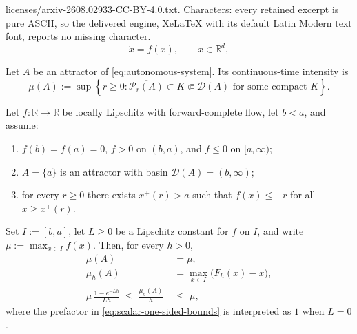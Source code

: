 \documentclass[10pt,a4paper]{amsart}
\begin{document}
licenses/arxiv-2608.02933-CC-BY-4.0.txt. Characters: every retained excerpt is pure ASCII, so the delivered engine, XeLaTeX with its default Latin Modern text font, reports no missing character.
\begin{equation}
\label{eq:autonomous-system}
    \dot x=f(x),\qquad x\in\mathbb R^d,
\end{equation}

\begin{definition}
\label{def:continuous-intensity}
Let $A$ be an attractor of \eqref{eq:autonomous-system}. Its continuous-time intensity is
\begin{equation}
\label{eq:continuous-intensity}
    \mu(A)
    :=
    \sup\left\{
    r\geq0:
    \overline{\mathcal P_r(A)}
    \subset K\Subset\mathcal D(A)
    \text{ for some compact }K
    \right\}.
\end{equation}
\end{definition}

\begin{proposition}
\label{prop:scalar-one-sided}
Let $f:\mathbb R\to\mathbb R$ be locally Lipschitz with forward-complete
flow, let $b<a$, and assume:
\begin{enumerate}
\item $f(b)=f(a)=0$, $f>0$ on $(b,a)$, and $f\leq0$ on $[a,\infty)$;
\item $A=\{a\}$ is an attractor with basin
$\mathcal D(A)=(b,\infty)$;
\item for every $r\geq0$ there exists $x^+(r)>a$ such that
$f(x)\leq-r$ for all $x\geq x^+(r)$.
\end{enumerate}
Set $I:=[b,a]$, let $L\geq0$ be a Lipschitz constant for $f$ on $I$,
and write
    $\mu:=\max_{x\in I}f(x)$.
Then, for every $h>0$,
\begin{align}
\label{eq:scalar-one-sided-continuous}
    \mu(A)&=\mu,\\
\label{eq:scalar-one-sided-discrete}
    \mu_h(A)&=\max_{x\in I}\bigl(F_h(x)-x\bigr),\\
\label{eq:scalar-one-sided-bounds}
    \mu\,\frac{1-e^{-Lh}}{Lh}
    \;\leq\;
    \frac{\mu_h(A)}{h}
    \;&\leq\;
    \mu,
\end{align}
where the prefactor in \eqref{eq:scalar-one-sided-bounds} is
interpreted as $1$ when $L=0$.
\end{proposition}
\end{document}
